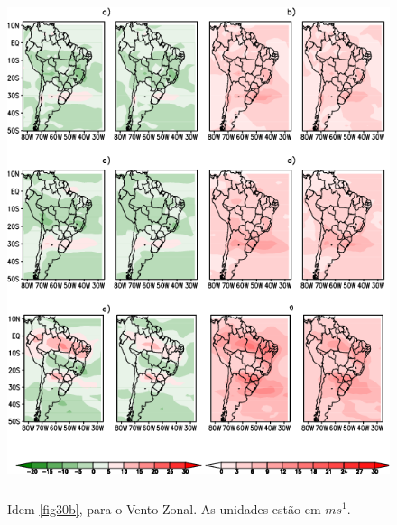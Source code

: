 \begin{figure}[!h]
\centering
\includegraphics[height=15cm]{./figs/campo_vies_eqm-uvel.png}
\caption{Idem \autoref{fig30b}, para o Vento Zonal. As unidades estão em $ms^{1}$.}
\label{fig32b}
\end{figure}

\break

